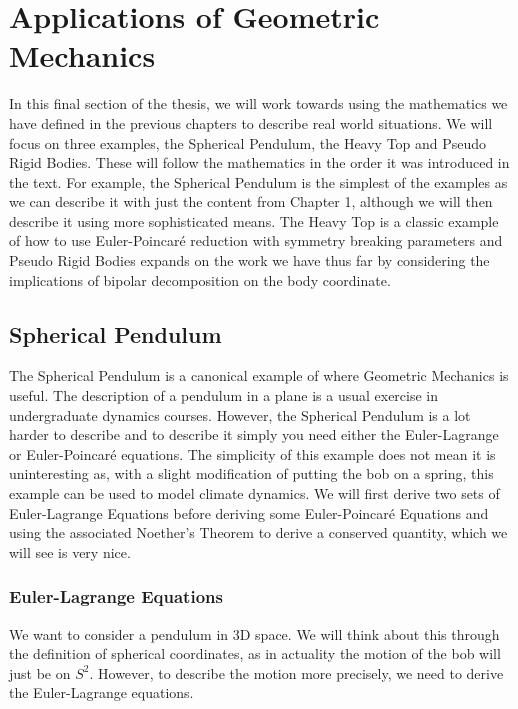 
\section{Applications of Geometric Mechanics}
In this final section of the thesis, we will work towards using the mathematics we have defined in the previous chapters to describe real world situations. We will focus on three examples, the Spherical Pendulum, the Heavy Top and Pseudo Rigid Bodies. These will follow the mathematics in the order it was introduced in the text. For example, the Spherical Pendulum is the simplest of the examples as we can describe it with just the content from Chapter 1, although we will then describe it using more sophisticated means. The Heavy Top is a classic example of how to use Euler-Poincar\'e reduction with symmetry breaking parameters and Pseudo Rigid Bodies expands on the work we have thus far by considering the implications of bipolar decomposition on the body coordinate.

\subsection{Spherical Pendulum}
The Spherical Pendulum is a canonical example of where Geometric Mechanics is useful. The description of a pendulum in a plane is a usual exercise in undergraduate dynamics courses. However, the Spherical Pendulum is a lot harder to describe and to describe it simply you need either the Euler-Lagrange or Euler-Poincar\'e equations. The simplicity of this example does not mean it is uninteresting as, with a slight modification of putting the bob on a spring, this example can be used to model climate dynamics. We will first derive two sets of Euler-Lagrange Equations before deriving some Euler-Poincar\'e Equations and using the associated Noether's Theorem to derive a conserved quantity, which we will see is very nice.

\subsubsection{Euler-Lagrange Equations}

We want to consider a pendulum in 3D space. We will think about this through the definition of spherical coordinates, as in actuality the motion of the bob will just be on $S^2$. However, to describe the motion more precisely, we need to derive the Euler-Lagrange equations.~\cite{holm_2011}\\

